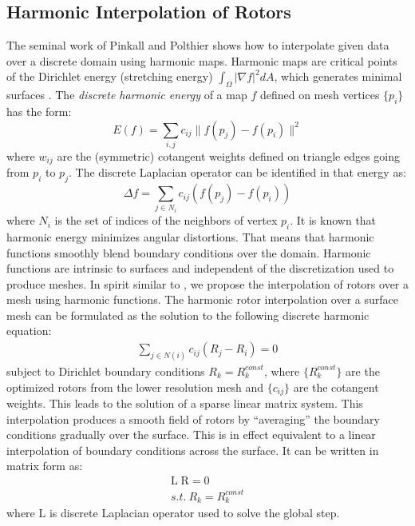 \documentclass{birkjour}
\numberwithin{equation}{section}
\begin{document}
\subsection{Harmonic Interpolation of Rotors}
\label{section:harmonic_interpolation_rotors}

The seminal work of Pinkall and Polthier \cite{Pinkall1993} shows how to interpolate given data over a discrete domain using harmonic maps. Harmonic maps are critical points of the Dirichlet energy (stretching energy) $\int_{\Omega}{ |\nabla f|^2 dA }$, which generates minimal surfaces \cite{Pinkall1993}. 
The \emph{discrete harmonic energy} \cite{Pinkall1993} of a map $f$ defined on mesh vertices $\{p_i\}$ has the form:
\begin{equation}
E(f) = \sum_{i,j}{c_{ij} \| f(p_j) - f(p_i) \|^2 }
\end{equation}
where $w_{ij}$ are the (symmetric) cotangent weights \cite{Pinkall1993} defined on triangle edges going from $p_i$ to $p_j$. The discrete Laplacian operator can be identified in that energy as:
\begin{equation}
\Delta f = \sum_{j \in N_i} { c_{ij} ( f(p_j) - f(p_i) ) }
\end{equation}
where $N_i$ is the set of indices of the neighbors of vertex $p_i$. It is known that harmonic energy minimizes angular distortions. That means that harmonic functions smoothly blend boundary conditions over the domain. Harmonic functions are intrinsic to surfaces and independent of the discretization used to produce meshes. In spirit similar to \cite{Zayer2005}, we propose the interpolation of rotors over a mesh using harmonic functions. The harmonic rotor interpolation over a surface mesh can be formulated as the solution to the following discrete harmonic equation:
\begin{eqnarray}
\label{eq:harmonic_rotor}
   \sum_{j \in N(i)} { c_{ij} ( R_j - R_i ) } = 0
\end{eqnarray}
subject to Dirichlet boundary conditions $R_k = R^{const}_k$, where $\{R^{const}_k\}$ are the optimized rotors from the lower resolution mesh and $\{c_{ij}\}$ are the cotangent weights. This leads to the solution of a sparse linear matrix system. This interpolation produces a smooth field of rotors by ``averaging'' the boundary conditions gradually over the surface. This is in effect equivalent to a linear interpolation of boundary conditions across the surface. It can be written in matrix form as:
\begin{eqnarray}
	\mathrm L \; \mathrm R = 0\\
	s.t. \ R_k = R^{const}_k \nonumber
\end{eqnarray}
where $\mathrm L$ is discrete Laplacian operator used to solve the global step.
\end{document}
